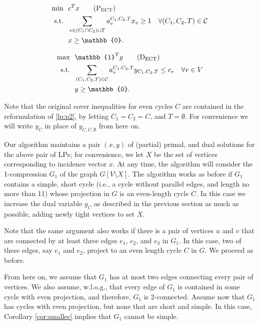 \documentclass{article}
\newcommand{\st}{\ensuremath{\mbox{s.t.}}}
\newcommand{\ect}{\ensuremath{\mbox{ECT}}}
\newcommand{\C}{\ensuremath{\mathcal{C}}}
\newcommand{\0}{\mathbb{0}}
\newcommand{\1}{\mathbb{1}}
\begin{document}
\hspace*{-.7cm}
\begin{minipage}{.48\textwidth}
\begin{align}
  \min ~~ & c^Tx \tag{$\mbox{P}_{\scriptsize \ect}$} \label{lp:p3} \\
  \st ~~ & \sum_{v \in (C_1 \cap C_2)\cup T}a^{C_1,C_2,T}_vx_v \geq 1 \quad \forall 
  (C_1,C_2,T) \in \C \notag \\
          & x \geq \0. \notag
\end{align}
\end{minipage}
\hspace*{1ex}
\vline
\hspace*{1ex}
\begin{minipage}{.48\textwidth}
\begin{align}
  \max ~~ & \1^Ty \tag{$\mbox{D}_{\scriptsize \ect}$} \label{lp:d3} \\
  \st ~~ & \sum_{(C_1,C_2,T) \in \C} a^{C_1,C_2,T}_vy_{C_1,C_2,T} \leq c_v \quad \forall v
  \in V
           \notag \\
          & y \geq \0. \notag
\end{align}
\end{minipage}
\medskip

Note that the original cover inequalities for even cycles 
$C$ are contained in the reformulation of \eqref{lp:p2}, by
letting $C_1=C_2=C$, and $T=\emptyset$. For convenience we will write
$y_C$ in place of $y_{C,C,\emptyset}$ from here on. 

Our algorithm maintains a pair $(x,y)$ of (partial) primal,
and dual solutions for the above pair of LPs; for convenience, we let $X$ be the set of vertices
corresponding to incidence vector $x$. 
At any time, the algorithm will consider the 1-compression $G_1$
of the graph $G[V\setminus X]$. The algorithm works as before if $G_1$
contains a simple, short cycle (i.e., a cycle without parallel edges, and length no more
than 11) whose
projection in $G$ is an even-length cycle $C$. In this case we
increase the dual variable $y_{C}$ as described in the previous
section as much as possible, adding newly tight vertices to set $X$. 

Note that the same argument also works if there is a pair of vertices $u$ and $v$ that are connected
by at least three edges $e_1$, $e_2$, and $e_3$ in $G_1$. In this case, two of these edges, say
$e_1$ and $e_2$, project to an even length cycle $C$ in $G$. We proceed as before.

From here on, we assume that $G_1$ has at most two edges connecting every pair of vertices. 
We also assume, w.l.o.g., that every edge of $G_1$ is contained in some cycle with even projection,
and therefore, $G_1$ is 2-connected. Assume now that $G_1$ has cycles with even projection, but none
that are short and simple. In this case, Corollary \ref{cor:smallec} implies that $G_1$
cannot be simple. 
\end{document}

